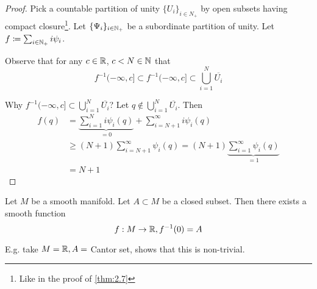 \begin{proof}
    Pick a countable partition of unity \(\{U_i\}_{i\in N_+}\) by open subsets having compact closure\footnote{Like in the proof of \ref{thm:2.7}}.
    Let \(\{\Psi_i\}_{i\in\mathbb{N}_+}\) be a subordinate partition of unity. Let \(f\coloneqq \sum_{i\in\mathbb{N}_+}i\psi_i\).
    
    Observe that for any \(c\in\mathbb{R}\), \(c<N\in \mathbb{N}\) that \[f^{-1}(-\infty,c]\subset f^{-1}(-\infty,c]\subset \bigcup_{i=1}^N \overline{U_i}\]

    Why \(f^{-1}(-\infty,c]\subset\bigcup_{i=1}^N \overline{U_i}\)? Let \(q\not\in \bigcup_{i=1}^N \overline{U_i}\).
    Then \begin{align*}
        f(q)&=  \underbrace{\sum_{i=1}^{N} i \psi_i(q)}_{=0} + \sum_{i=N+1}^\infty i\psi_i(q)\\
        & \geq (N+1)\sum_{i=N+1}^\infty\psi_i(q) = (N+1)\underbrace{\sum_{i=1}^\infty \psi_i(q)}_{=1}\\
        &=N+1 
    \end{align*} 
\end{proof}

 \begin{proposition}\label{prop:2.11}
    Let \(M\) be a smooth manifold. Let \(A\subset M\) be a closed subset. Then 
    there exists a smooth function \[f:M\to\mathbb{R},f^{-1}(0)=A\]
 \end{proposition}

 E.g. take \(M=\mathbb{R},A=\) Cantor set, shows that this is non-trivial.

